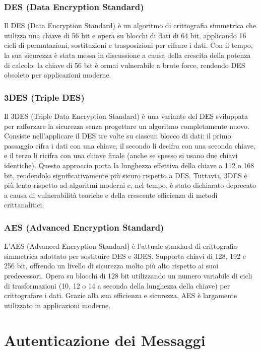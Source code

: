 \subsubsection{DES (Data Encryption Standard)}

Il DES (Data Encryption Standard) è un algoritmo di crittografia simmetrica che utilizza una chiave di 56 bit e opera su blocchi di dati di 64 bit, applicando 16 cicli di permutazioni, sostituzioni e trasposizioni per cifrare i dati. Con il tempo, la sua sicurezza è stata messa in discussione a causa della crescita della potenza di calcolo: la chiave di 56 bit è ormai vulnerabile a brute force, rendendo DES obsoleto per applicazioni moderne.

\subsubsection{3DES (Triple DES)}

Il 3DES (Triple Data Encryption Standard) è una variante del DES sviluppata per rafforzare la sicurezza senza progettare un algoritmo completamente nuovo. Consiste nell'applicare il DES tre volte su ciascun blocco di dati: il primo passaggio cifra i dati con una chiave, il secondo li decifra con una seconda chiave, e il terzo li ricifra con una chiave finale (anche se spesso si usano due chiavi identiche). Questo approccio porta la lunghezza effettiva della chiave a 112 o 168 bit, rendendolo significativamente più sicuro rispetto a DES. Tuttavia, 3DES è più lento rispetto ad algoritmi moderni e, nel tempo, è stato dichiarato deprecato a causa di vulnerabilità teoriche e della crescente efficienza di metodi crittanalitici.

\subsubsection{AES (Advanced Encryption Standard)}

L'AES (Advanced Encryption Standard) è l'attuale standard di crittografia simmetrica adottato per sostituire DES e 3DES. Supporta chiavi di 128, 192 e 256 bit, offrendo un livello di sicurezza molto più alto rispetto ai suoi predecessori. Opera su blocchi di 128 bit utilizzando un numero variabile di cicli di trasformazioni (10, 12 o 14 a seconda della lunghezza della chiave) per crittografare i dati. Grazie alla sua efficienza e sicurezza, AES è largamente utilizzato in applicazioni moderne.

\section{Autenticazione dei Messaggi}

